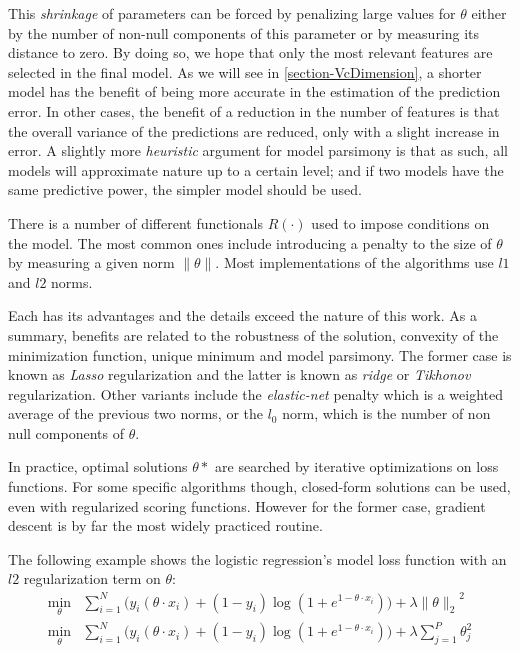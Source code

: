 This \textit{shrinkage} of parameters can be forced by penalizing large values for $\theta$ either by the number of non-null components of this parameter or by measuring its distance to zero. By doing so, we hope that only the most relevant features are selected in the final model. As we will see in \cref{section-VcDimension}, a shorter model has the benefit of being more accurate in the estimation of the prediction error. In other cases, the benefit of a reduction in the number of features is that the overall variance of the predictions are reduced, only with a slight increase in error. A slightly more \textit{heuristic} argument for model parsimony is that as such, all models will approximate nature up to a certain level; and if two models have the same predictive power, the simpler model should be used.


There is a number of different functionals $R(\cdot)$ used to impose conditions on the model. The most common ones include introducing a penalty to the size of $\theta$ by measuring a given norm $\| \theta \|$. Most implementations of the algorithms use $l1$ and $l2$ norms.

Each has its advantages and the details exceed the nature of this work. As a summary, benefits are related to the robustness of the solution, convexity of the minimization function, unique minimum and model parsimony. The former case is known as \textit{ Lasso} regularization and the latter is known as \textit{ridge} or \textit{Tikhonov} regularization. Other variants include the \textit{elastic-net} penalty which is a weighted average of the previous two norms, or the $l_0$ norm, which is the number of non null components of $\theta$.

In practice, optimal solutions $\theta*$ are searched by iterative optimizations on loss functions.
For some specific algorithms though, closed-form solutions can be used, even with regularized scoring functions.
However for the former case, gradient descent is by far the most widely practiced routine.

The following example shows the logistic regression's model loss function with an $l2$ regularization term on $\theta$:
\begin{equation}\label{eq:logitRegularization}
\begin{split}
\min_{\theta} & \sum_{i=1}^N \big(y_i ( \theta \cdot x_i ) + (1- y_i)\log(1 + e^{1- \theta \cdot x_i} ) \big) + \lambda { \| \theta \|_{2}}^2 \\
\min_{\theta} & \sum_{i=1}^N \big(y_i ( \theta \cdot x_i ) + (1- y_i)\log(1 + e^{1- \theta \cdot x_i} ) \big) + \lambda \sum_{j=1}^P \theta_j^2
\end{split}
\end{equation}

